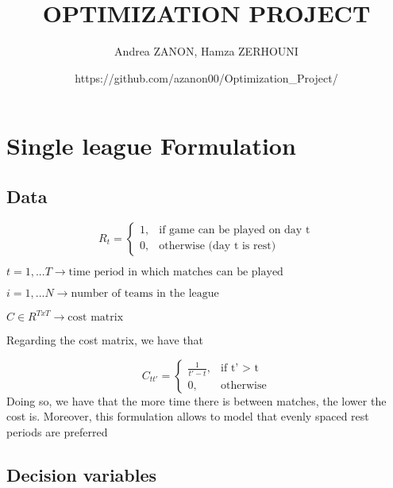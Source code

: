 \documentclass[12pt, letterpaper]{article}
\title{OPTIMIZATION PROJECT}
\author{Andrea ZANON, Hamza ZERHOUNI}
\date{https://github.com/azanon00/Optimization\_Project/}
\begin{document}
\maketitle

\section{Single league Formulation}

\subsection*{Data}
\begin{flushleft}
\begin{equation}
  R_t =\begin{cases}
    1, & \text{if game can be played on day t}\\
    0, & \text{otherwise (day t is rest)}
  \end{cases}
\end{equation}

\hspace{1cm}

$t = 1, ... T \rightarrow{\text{time period in which matches can be played}}$ \\

\hspace{1cm}

$i = 1, ... N \rightarrow{\text{number of teams in the league}}$

\hspace{1cm}

$C \in R^{T x T} \rightarrow{\text{cost matrix}}$

Regarding the cost matrix, we have that 

\begin{equation}
  C_{tt'} =\begin{cases}
    \frac{1}{t' - t}, & \text{if t' $>$ t}\\
    0, & \text{otherwise}
  \end{cases}
\end{equation}
Doing so, we have that the more time there is between matches, the lower the cost is. Moreover, this formulation allows to model that evenly spaced rest periods are preferred

\end{flushleft}

\subsection*{Decision variables}
\end{document}
